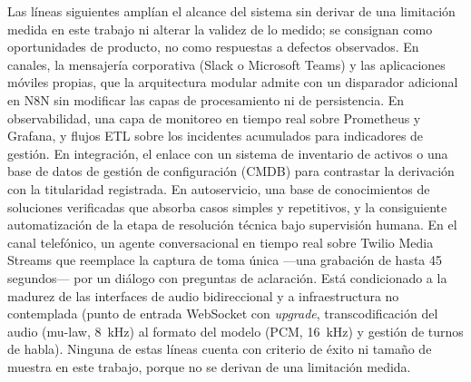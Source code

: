 Las líneas siguientes amplían el alcance del sistema sin derivar de una limitación medida en este trabajo ni alterar la validez de lo medido; se consignan como oportunidades de producto, no como respuestas a defectos observados. En canales, la mensajería corporativa (Slack o Microsoft Teams) y las aplicaciones móviles propias, que la arquitectura modular admite con un disparador adicional en N8N sin modificar las capas de procesamiento ni de persistencia. En observabilidad, una capa de monitoreo en tiempo real sobre Prometheus y Grafana, y flujos ETL sobre los incidentes acumulados para indicadores de gestión. En integración, el enlace con un sistema de inventario de activos o una base de datos de gestión de configuración (CMDB) para contrastar la derivación con la titularidad registrada. En autoservicio, una base de conocimientos de soluciones verificadas que absorba casos simples y repetitivos, y la consiguiente automatización de la etapa de resolución técnica bajo supervisión humana. En el canal telefónico, un agente conversacional en tiempo real sobre Twilio Media Streams que reemplace la captura de toma única ---una grabación de hasta 45 segundos--- por un diálogo con preguntas de aclaración. Está condicionado a la madurez de las interfaces de audio bidireccional y a infraestructura no contemplada (punto de entrada WebSocket con \emph{upgrade}, transcodificación del audio (mu-law, 8~kHz) al formato del modelo (PCM, 16~kHz) y gestión de turnos de habla). Ninguna de estas líneas cuenta con criterio de éxito ni tamaño de muestra en este trabajo, porque no se derivan de una limitación medida.

\newpage
